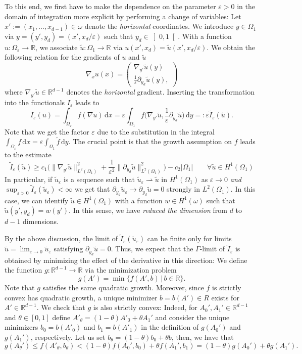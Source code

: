 \documentclass[a4paper,12pt]{article}
\newcommand{\R}{\mathbb{R}}
\newcommand{\eps}{\varepsilon}
\newcommand{\dd}{\,\mathrm{d}}
\newcommand{\wt}{\widetilde}
\begin{document}
To this end, we first have to make the dependence on the parameter $\eps>0$ in the domain of integration more explicit by performing a change of variables: Let $x' := (x_1,\ldots, x_{d-1})\in \omega$
denote the \emph{horizontal} coordinates. We introduce $y \in\Omega_1$ via $y = (y',y_d) = (x', x_d/\eps)$ such that $y_d\in\left]0,1\right[$. With a function $u:\Omega_\eps\to \R$, 
we associate $\wt u:\Omega_1\to \R$ via $u(x',x_d) = \wt u(x',x_d/\eps)$. We obtain the following relation for the gradients of $u$ and $\wt u$
\begin{equation}
\nabla_x u (x) = \begin{pmatrix}
\nabla_{y'} \wt u(y)\\ \frac{1}{\eps}\partial_{y_d}\wt u(y),
\end{pmatrix}
\end{equation}
where $\nabla_{y'} \wt u\in\R^{d-1}$ denotes the \emph{horizontal} gradient. Inserting the transformation into the functionals $I_\eps$
leads to
\[
I_\eps(u) = \int_{\Omega_\eps}f(\nabla u)\dd x = \eps\int_{\Omega_1}f\Big(\nabla_{y'}\wt u,\frac{1}{\eps}\partial_{y_d}\wt u\Big)\dd y=:\eps \wt I_\eps(\wt u).
\]
Note that we get the factor $\eps$ due to the substitution in the integral $\int_{\Omega_\eps} f\dd x= \eps \int_{\Omega_1}\wt f \dd y$.
 The crucial point is that the growth assumption on $f$ leads to
 the estimate
 \begin{equation}\label{eq:lowerBound}
     \wt I_\eps(\wt u) \geq c_1\Big(\|\nabla_{y'}\wt u\|^2_{L^2(\Omega_1)}+\frac{1}{\eps^2}\|\partial_{y_d}\wt u\|^2_{L^2(\Omega_1)}\Big) -c_2|\Omega_1|\qquad\forall \wt u\in H^1(\Omega_1)
 \end{equation}
 In particular, if $\wt u_\eps $ is a sequence such that $\wt u_\eps\rightharpoonup \wt u$ in $H^1(\Omega_1)$ as $\eps\to0$
 \emph{and}  $\sup_{\eps >0}\wt I_\eps(\wt u_\eps) < \infty$ we get that $\partial_{y_d}\wt u_\eps \to \partial_{y_d} \wt u = 0$ strongly in $L^2(\Omega_1)$. In  this case, we can identify $\wt u \in H^1(\Omega_1)$ with a function $w \in H^1(\omega)$ such that $\wt u(y',y_d) = w(y')$. In this sense, we have \emph{reduced the dimension} from $d$ to $d{-}1$ dimensions.

By the above discussion, the limit of $\wt I_\eps(\wt u_\eps)$ can be finite only for limits $\wt u = \lim_{\eps\to 0}\wt u_\eps$ satisfying $\partial_{y_d} \wt u = 0$. Thus, we expect that the 
$\Gamma$-limit of $\wt I_\eps$ is obtained by minimizing the effect of the derivative in this direction: We define the function
$g:\R^{d-1}\to \R$ via the minimization problem
\[
g(A') = \min\{f(A',b)\,|\, b\in \R\}.
\]
Note that $g$ satisfies the same quadratic growth. Moreover, since $f$ is strictly convex has quadratic growth, a unique minimizer
$b=b(A')\in R$ exists for $A'\in\R^{d-1}$. We check that $g$ is also strictly convex: Indeed, for $A_0',A_1'\in\R^{d-1}$ and $\theta \in [0,1]$ define $A'_\theta = (1{-}\theta)A'_0 +\theta A_1'$ and consider the unique minimizers $b_0 = b(A'_
0)$ and $b_1 = b(A'_
1)$ in the definition of $g(A_0')$ and $g(A_1')$, respectively. 
Let us set $b_\theta = (1{-}\theta)b_0 +\theta b$, then, we have that
\[
g(A_\theta') \leq f(A'_\theta, b_\theta) < (1{-}\theta)f(A_0',b_0) +\theta f(A_1',b_1) = (1{-}\theta)g(A_0') +\theta g(A_1').
\]
\end{document}
